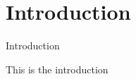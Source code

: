 %
%
%


\section{Introduction}\label{Introduction}
\begin{frame}{Introduction}

  This is the introduction

\end{frame}

